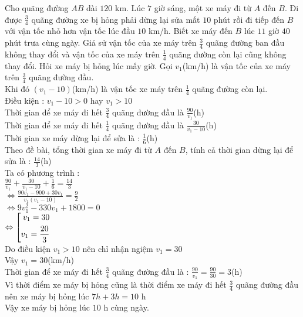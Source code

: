 \begin{ex}%
Cho quãng đường $AB$ dài $120$ km. Lúc $7$ giờ sáng, một xe máy đi từ $A$ đến $B$. Đi được $\displaystyle \frac{3}{4}$ quãng đường xe bị hỏng phải dừng lại sửa mất $10$ phút rồi đi tiếp đến $B$ với vận tốc nhỏ hơn vận tốc lúc đầu $10$ km/h. Biết xe máy đến $B$ lúc $11$ giờ $40$ phút trưa cùng ngày. Giả sử vận tốc của xe máy trên $\displaystyle \frac{3}{4}$ quãng đường ban đầu không thay đổi và vận tốc của xe máy trên $\displaystyle \frac{1}{4}$ quãng đường còn lại cũng không thay đổi. Hỏi xe máy bị hỏng lúc mấy giờ.
\loigiai
    {Gọi $v_1$(km/h) là vận tốc của xe máy trên $\displaystyle \frac{3}{4}$ quãng đường đầu.\\
    Khi đó $(v_1 -10)$(km/h) là vận tốc xe máy trên $\displaystyle \frac{1}{4}$ quãng đường còn lại.\\
    Điều kiện : $v_1 -10 >0$ hay $v_1>10$\\
    Thời gian để xe máy đi hết $\displaystyle \frac{3}{4}$ quãng đường đầu là $\displaystyle \frac{90}{v_1}$(h)\\
    Thời gian để xe máy đi hết $\displaystyle \frac{1}{4}$ quãng đường đầu là $\displaystyle \frac{30}{v_1 -10}$(h)\\ 
    Thời gian xe máy dừng lại để sửa là : $\displaystyle \frac{1}{6}$(h)\\
    Theo đề bài, tổng thời gian xe máy đi từ $A$ đến $B$, tính cả thời gian dừng lại để sửa là : $\displaystyle \frac{14}{3}$(h)\\
    Ta có phương trình : \\
    $\displaystyle \frac{90}{v_1}+\frac{30}{v_1-10}+\frac{1}{6}=\frac{14}{3}$\\
    $\displaystyle \Leftrightarrow \frac{90v_1-900+30v_1}{v_1(v_1-10)}=\frac{9}{2}$\\
    $\Leftrightarrow 9v_1^2-330v_1+1800=0$\\
    $\Leftrightarrow \left[\begin{aligned}v_1=30\\v_1=\frac{20}{3}\end{aligned}\right. $\\
    Do điều kiện $v_1>10$ nên chỉ nhận ngiệm $v_1=30$\\
    Vậy $v_1=30$(km/h)\\
    Thời gian để xe máy đi hết $\displaystyle \frac{3}{4}$ quãng đường đầu là : $\displaystyle \frac{90}{v_1}=\frac{90}{30}=3$(h)\\
    Vì thời điểm xe máy bị hỏng cũng là thời điểm xe máy đi hết $\displaystyle \frac{3}{4}$ quãng đường đầu nên xe máy bị hỏng lúc $7h+3h=10$ h\\
    Vậy xe máy bị hỏng lúc $10$ h cùng ngày.
    }
\end{ex}

